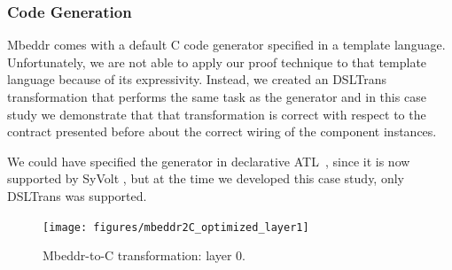 \subsubsection{Code Generation}

Mbeddr comes with a default C code generator specified in a template language. Unfortunately, we are not able to apply our proof technique to that template language because of its expressivity. Instead, we created an DSLTrans transformation that performs the same task as the generator and in this case study we demonstrate that that transformation is correct with respect to the contract presented before about the correct wiring of the component instances.

We could have specified the generator in declarative ATL~\cite{Jouault2006a}, since it is now supported by SyVolt \cite{Oakes}, but at the time we developed this case study, only DSLTrans was supported.

\begin{figure}
\begin{center}
  \texttt{[image: figures/mbeddr2C\_optimized\_layer1]}
  \caption{Mbeddr-to-C transformation: layer 0.}
  \label{fig:mb2c_layer_1}
\end{center}
\end{figure}










































